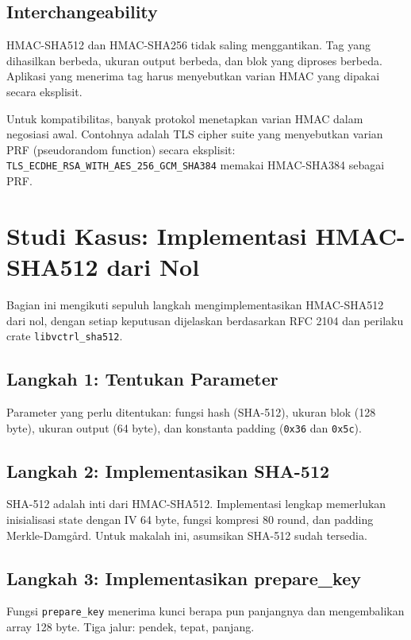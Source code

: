 \documentclass[11pt,a4paper]{article}
\begin{document}
\subsection{Interchangeability}

HMAC-SHA512 dan HMAC-SHA256 tidak saling menggantikan. Tag yang dihasilkan berbeda, ukuran output berbeda, dan blok yang diproses berbeda. Aplikasi yang menerima tag harus menyebutkan varian HMAC yang dipakai secara eksplisit.

Untuk kompatibilitas, banyak protokol menetapkan varian HMAC dalam negosiasi awal. Contohnya adalah TLS cipher suite yang menyebutkan varian PRF (pseudorandom function) secara eksplisit: \texttt{TLS\_ECDHE\_RSA\_WITH\_AES\_256\_GCM\_SHA384} memakai HMAC-SHA384 sebagai PRF.

\section{Studi Kasus: Implementasi HMAC-SHA512 dari Nol}

Bagian ini mengikuti sepuluh langkah mengimplementasikan HMAC-SHA512 dari nol, dengan setiap keputusan dijelaskan berdasarkan RFC 2104 dan perilaku crate \texttt{libvctrl\_sha512}.

\subsection{Langkah 1: Tentukan Parameter}

Parameter yang perlu ditentukan: fungsi hash (SHA-512), ukuran blok (128 byte), ukuran output (64 byte), dan konstanta padding (\texttt{0x36} dan \texttt{0x5c}).

\subsection{Langkah 2: Implementasikan SHA-512}

SHA-512 adalah inti dari HMAC-SHA512. Implementasi lengkap memerlukan inisialisasi state dengan IV 64 byte, fungsi kompresi 80 round, dan padding Merkle-Damgård. Untuk makalah ini, asumsikan SHA-512 sudah tersedia.

\subsection{Langkah 3: Implementasikan prepare\_key}

Fungsi \texttt{prepare\_key} menerima kunci berapa pun panjangnya dan mengembalikan array 128 byte. Tiga jalur: pendek, tepat, panjang.
\end{document}
